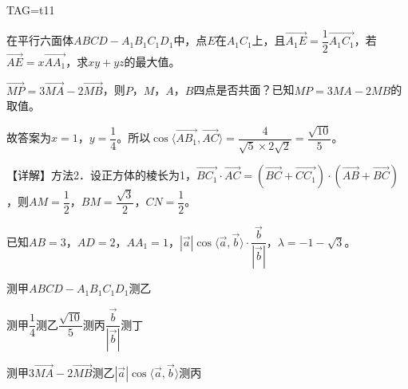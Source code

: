 \documentclass[fontset=none]{ctexart}
\let\frac\dfrac
\begin{document}
\noindent TAG=t11

\noindent 在平行六面体\(ABCD-A_1B_1C_1D_1\)中，点\(E\)在\(A_1C_1\)上，且\(\overrightarrow{A_1E}=\frac{1}{2}\overrightarrow{A_1C_1}\)，若\(\overrightarrow{AE}=x\overrightarrow{AA_1}\)，求\(xy+yz\)的最大值。

\noindent \(\overrightarrow{MP}=3\overrightarrow{MA}-2\overrightarrow{MB}\)，则\(P\)，\(M\)，\(A\)，\(B\)四点是否共面？已知\(MP=3MA-2MB\)的取值。

\noindent 故答案为\(x=1\)，\(y=\frac{1}{4}\)。所以\(\cos\langle \overrightarrow{AB_1},\overrightarrow{AC}\rangle=\frac{4}{\sqrt{5}\times2\sqrt{2}}=\frac{\sqrt{10}}{5}\)。

\noindent 【详解】方法2．设正方体的棱长为1，\(\overrightarrow{BC_{1}} \cdot \overrightarrow{AC} = ( \overrightarrow{BC} + \overrightarrow{CC_{1}} ) \cdot ( \overrightarrow{AB} + \overrightarrow{BC} )\)，则\(AM = \frac{1}{2}\)，\(BM = \frac{\sqrt{3}}{2}\)，\(CN = \frac{1}{2}\)。

\noindent 已知\(AB=3\)，\(AD=2\)，\(AA_1=1\)，\(| \overrightarrow{a} |\cos\langle \overrightarrow{a},\overrightarrow{b} \rangle \cdot \frac{\overrightarrow{b}}{| \overrightarrow{b} |}\)，\(\lambda=-1-\sqrt{3}\)。

\noindent 测甲\(ABCD-A_1B_1C_1D_1\)测乙

\noindent 测甲\(\frac{1}{4}\)测乙\(\frac{\sqrt{10}}{5}\)测丙\(\frac{\overrightarrow{b}}{| \overrightarrow{b} |}\)测丁

\noindent 测甲\(3\overrightarrow{MA}-2\overrightarrow{MB}\)测乙\(| \overrightarrow{a} |\cos\langle \overrightarrow{a},\overrightarrow{b} \rangle\)测丙
\end{document}
